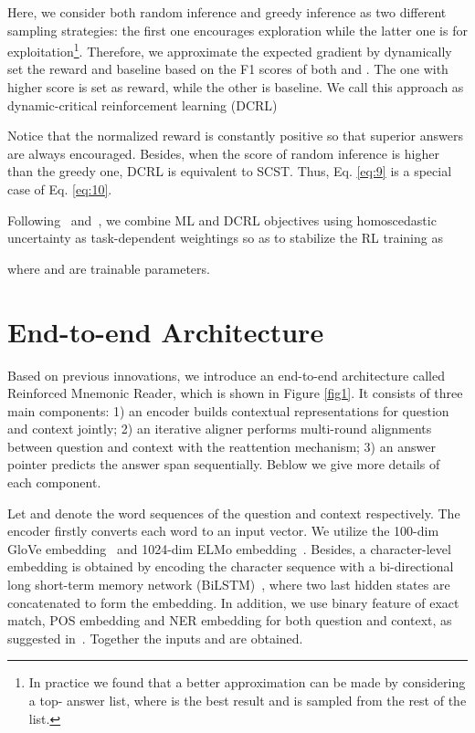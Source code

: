 \documentclass{article}
\begin{document}
Here, we consider both random inference and greedy inference as two different sampling strategies: the first one encourages exploration while the latter one is for exploitation\footnote{In practice we found that a better approximation can be made by considering a top- answer list, where  is the best result and  is sampled from the rest of the list.}. Therefore, we approximate the expected gradient by dynamically set the reward and baseline based on the F1 scores of both  and . The one with higher score is set as reward, while the other is baseline. We call this approach as dynamic-critical reinforcement learning (DCRL)


Notice that the normalized reward is constantly positive so that superior answers are always encouraged. Besides, when the score of random inference is higher than the greedy one, DCRL is equivalent to SCST. Thus, Eq. \ref{eq:9} is a special case of Eq. \ref{eq:10}.

Following~\cite{Xiong17} and~\cite{Kendall17}, we combine ML and DCRL objectives using homoscedastic uncertainty as task-dependent weightings so as to stabilize the RL training as

where  and  are trainable parameters.

 \section{End-to-end Architecture}
Based on previous innovations, we introduce an end-to-end architecture called Reinforced Mnemonic Reader, which is shown in Figure \ref{fig1}. 
It consists of three main components: 
1) an encoder builds contextual representations for question and context jointly; 
2) an iterative aligner performs multi-round alignments between question and context with the reattention mechanism; 
3) an answer pointer predicts the answer span sequentially.
Beblow we give more details of each component.

Let  and  denote the word sequences of the question and context respectively. 
The encoder firstly converts each word to an input vector.
We utilize the 100-dim GloVe embedding~\cite{Pennington14} and 1024-dim ELMo embedding~\cite{Elmo17}. Besides, a character-level embedding is obtained by encoding the character sequence with a bi-directional long short-term memory network (BiLSTM)~\cite{Hochreiter97}, where two last hidden states are concatenated to form the embedding.
In addition, we use binary feature of exact match, POS embedding and NER embedding for both question and context, as suggested in~\cite{Chen17a}. 
Together the inputs  and  are obtained.
\end{document}
